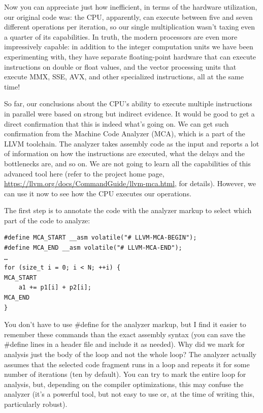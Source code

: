 Now you can appreciate just how inefficient, in terms of the hardware utilization, our original code was: the CPU, apparently, can execute between five and seven different operations per iteration, so our single multiplication wasn't taxing even a quarter of its capabilities. In truth, the modern processors are even more impressively capable: in addition to the integer computation units we have been experimenting with, they have separate floating-point hardware that can execute instructions on double or float values, and the vector processing units that execute MMX, SSE, AVX, and other specialized instructions, all at the same time!


So far, our conclusions about the CPU's ability to execute multiple instructions in parallel were based on strong but indirect evidence. It would be good to get a direct confirmation that this is indeed what's going on. We can get such confirmation from the Machine Code Analyzer (MCA), which is a part of the LLVM toolchain. The analyzer takes assembly code as the input and reports a lot of information on how the instructions are executed, what the delays and the bottlenecks are, and so on. We are not going to learn all the capabilities of this advanced tool here (refer to the project home page, \url{https://llvm.org/docs/CommandGuide/llvm-mca.html}, for details). However, we can use it now to see how the CPU executes our operations.

The first step is to annotate the code with the analyzer markup to select which part of the code to analyze:

\begin{lstlisting}[style=styleCXX]
#define MCA_START __asm volatile("# LLVM-MCA-BEGIN");
#define MCA_END __asm volatile("# LLVM-MCA-END");
…
for (size_t i = 0; i < N; ++i) {
MCA_START
	a1 += p1[i] + p2[i];
MCA_END
}
\end{lstlisting}

You don't have to use \#define for the analyzer markup, but I find it easier to remember these commands than the exact assembly syntax (you can save the \#define lines in a header file and include it as needed). Why did we mark for analysis just the body of the loop and not the whole loop? The analyzer actually assumes that the selected code fragment runs in a loop and repeats it for some number of iterations (ten by default). You can try to mark the entire loop for analysis, but, depending on the compiler optimizations, this may confuse the analyzer (it's a powerful tool, but not easy to use or, at the time of writing this, particularly robust).

